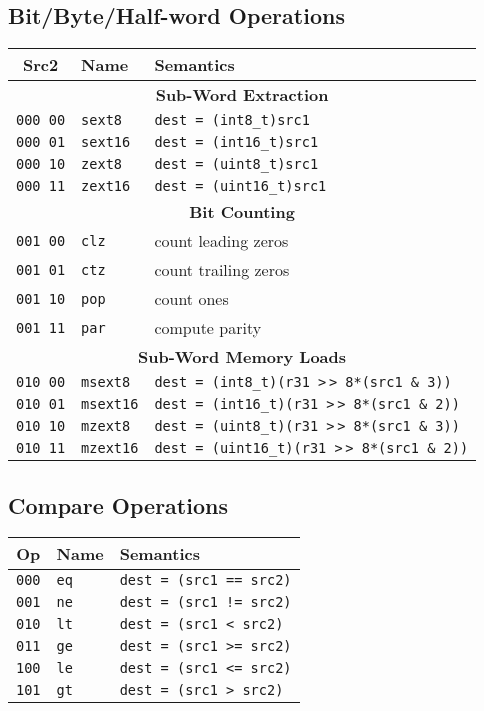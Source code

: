 \documentclass[10pt,DIV12]{scrartcl}
\newcommand{\ashr}{\textgreater$\,\!$\textgreater}
\begin{document}
\pagebreak
\subsection{Bit/Byte/Half-word Operations}
\label{sec:mask}

\begin{tabular}{cll}
\toprule
Src2 & Name & Semantics \\
\midrule
\multicolumn{3}{c}{\textsf{\textbf{Sub-Word Extraction}}} \\
\cmidrule{1-3}
\texttt{000 00} & \texttt{sext8}  & \texttt{dest = (int8\_t)src1} \\
\texttt{000 01} & \texttt{sext16} & \texttt{dest = (int16\_t)src1} \\
\texttt{000 10} & \texttt{zext8}  & \texttt{dest = (uint8\_t)src1} \\
\texttt{000 11} & \texttt{zext16} & \texttt{dest = (uint16\_t)src1} \\
\midrule
\multicolumn{3}{c}{\textsf{\textbf{Bit Counting}}} \\
\cmidrule{1-3}
\texttt{001 00} & \texttt{clz} & count leading zeros \\
\texttt{001 01} & \texttt{ctz} & count trailing zeros \\
\texttt{001 10} & \texttt{pop} & count ones \\
\texttt{001 11} & \texttt{par} & compute parity \\
\midrule
\multicolumn{3}{c}{\textsf{\textbf{Sub-Word Memory Loads}}} \\
\cmidrule{1-3}
\texttt{010 00} & \texttt{msext8}  & \texttt{dest = (int8\_t)(r31 \ashr{} 8*(src1 \& 3))} \\
\texttt{010 01} & \texttt{msext16} & \texttt{dest = (int16\_t)(r31 \ashr{} 8*(src1 \& 2))} \\
\texttt{010 10} & \texttt{mzext8}  & \texttt{dest = (uint8\_t)(r31 \ashr{} 8*(src1 \& 3))} \\
\texttt{010 11} & \texttt{mzext16} & \texttt{dest = (uint16\_t)(r31 \ashr{} 8*(src1 \& 2))} \\
\bottomrule  
\end{tabular}

\subsection{Compare Operations}
\label{sec:cmp}

\begin{tabular}{cll}
\toprule
Op & Name & Semantics \\
\midrule
\texttt{000} & \texttt{eq} & \texttt{dest = (src1 == src2)} \\
\texttt{001} & \texttt{ne} & \texttt{dest = (src1 != src2)} \\
\texttt{010} & \texttt{lt} & \texttt{dest = (src1 < src2)} \\
\texttt{011} & \texttt{ge} & \texttt{dest = (src1 >= src2)} \\
\texttt{100} & \texttt{le} & \texttt{dest = (src1 <= src2)} \\
\texttt{101} & \texttt{gt} & \texttt{dest = (src1 > src2)} \\
\bottomrule  
\end{tabular}
\end{document}

